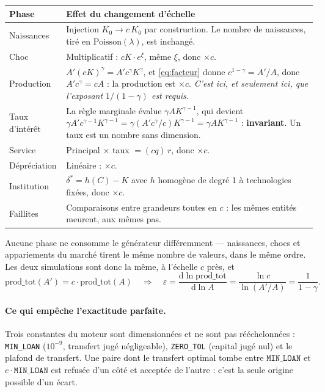 \documentclass[11pt,a4paper]{article}
\newcommand{\code}[1]{\texttt{#1}}
\begin{document}
\begin{center}\footnotesize
\begin{tabularx}{\textwidth}{@{}lX@{}}
\toprule
\textbf{Phase} & \textbf{Effet du changement d'échelle} \\
\midrule
Naissances & Injection $K_0 \to c\,K_0$ par construction. Le nombre de
naissances, tiré en $\mathrm{Poisson}(\lambda)$, est inchangé. \\
Choc & Multiplicatif : $cK \cdot e^{\xi}$, même $\xi$, donc $\times c$. \\
Production & $A'(cK)^{\gamma} = A' c^{\gamma} K^{\gamma}$, et
\eqref{eq:facteur} donne $c^{1-\gamma} = A'/A$, donc $A'c^{\gamma} = cA$ :
la production est $\times c$. \emph{C'est ici, et seulement ici, que
l'exposant $1/(1-\gamma)$ est requis.} \\
Taux d'intérêt & La règle marginale évalue $\gamma A K^{\gamma-1}$, qui
devient $\gamma A' c^{\gamma-1} K^{\gamma-1} = \gamma (A'c^{\gamma}/c)
K^{\gamma-1} = \gamma A K^{\gamma-1}$ : \textbf{invariant}. Un taux est un
nombre sans dimension. \\
Service & Principal $\times$ taux $= (cq)\,r$, donc $\times c$. \\
Dépréciation & Linéaire : $\times c$. \\
Institution & $\delta^{*} = h(C)-K$ avec $h$ homogène de degré 1 à
technologies fixées, donc $\times c$. \\
Faillites & Comparaisons entre grandeurs toutes en $c$ : les mêmes entités
meurent, aux mêmes pas. \\
\bottomrule
\end{tabularx}
\end{center}

\noindent Aucune phase ne consomme le générateur différemment --- naissances,
chocs et appariements du marché tirent le même nombre de valeurs, dans le
même ordre. Les deux simulations sont donc la même, à l'échelle $c$ près, et
\[
\mathrm{prod\_tot}(A') = c \cdot \mathrm{prod\_tot}(A)
\quad\Longrightarrow\quad
\varepsilon = \frac{\mathrm{d}\ln \mathrm{prod\_tot}}{\mathrm{d}\ln A}
= \frac{\ln c}{\ln (A'/A)} = \frac{1}{1-\gamma}.
\]

\paragraph{Ce qui empêche l'exactitude parfaite.} Trois constantes du moteur
sont dimensionnées et ne sont pas rééchelonnées : \code{MIN\_LOAN}
($10^{-9}$, transfert jugé négligeable), \code{ZERO\_TOL} (capital jugé nul)
et le plafond de transfert. Une paire dont le transfert optimal tombe entre
$\texttt{MIN\_LOAN}$ et $c\cdot\texttt{MIN\_LOAN}$ est refusée d'un côté et
acceptée de l'autre : c'est la seule origine possible d'un écart.
\end{document}
